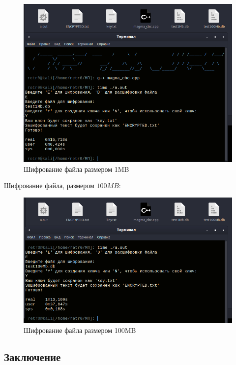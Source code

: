 \documentclass[oneside,final,14pt]{extreport}
\begin{document}
\begin{figure}[h!]
\includegraphics[width=1\textwidth]{24.png}
\caption{Шифрование файла размером 1MB}

\end{figure}



Шифрование файла, размером $100MB$:\\

\begin{figure}[h!]
\includegraphics[width=1\textwidth]{25.png}
\caption{Шифрование файла размером 100MB}
\end{figure}


\newpage


\begin{center}
\section*{Заключение}
 \end{center}
\end{document}
